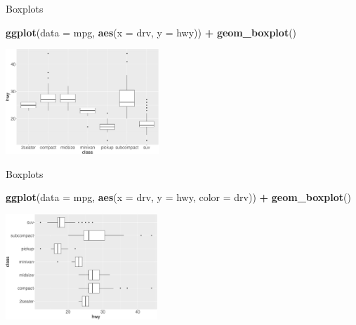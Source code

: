 \documentclass[ignorenonframetext,]{beamer}
\newenvironment{Shaded}{\begin{snugshade}}{\end{snugshade}}
\newcommand{\DataTypeTok}[1]{\textcolor[rgb]{0.13,0.29,0.53}{#1}}
\newcommand{\KeywordTok}[1]{\textcolor[rgb]{0.13,0.29,0.53}{\textbf{#1}}}
\newcommand{\NormalTok}[1]{#1}
\newcommand{\OperatorTok}[1]{\textcolor[rgb]{0.81,0.36,0.00}{\textbf{#1}}}
\newcommand{\StringTok}[1]{\textcolor[rgb]{0.31,0.60,0.02}{#1}}
\begin{document}
\begin{frame}[fragile]{Boxplots}
\protect\hypertarget{boxplots-1}{}

\begin{Shaded}
\begin{Highlighting}[]
\KeywordTok{ggplot}\NormalTok{(}\DataTypeTok{data =}\NormalTok{ mpg, }\KeywordTok{aes}\NormalTok{(}\DataTypeTok{x =}\NormalTok{ drv, }\DataTypeTok{y =}\NormalTok{ hwy)) }\OperatorTok{+}\StringTok{ }
\StringTok{  }\KeywordTok{geom_boxplot}\NormalTok{()}
\end{Highlighting}
\end{Shaded}

\begin{center}\includegraphics[height=150px]{data-visualization_files/figure-beamer/unnamed-chunk-140-1} \end{center}

\end{frame}

\begin{frame}[fragile]{Boxplots}
\protect\hypertarget{boxplots-2}{}

\begin{Shaded}
\begin{Highlighting}[]
\KeywordTok{ggplot}\NormalTok{(}\DataTypeTok{data =}\NormalTok{ mpg, }
       \KeywordTok{aes}\NormalTok{(}\DataTypeTok{x =}\NormalTok{ drv, }\DataTypeTok{y =}\NormalTok{ hwy, }\DataTypeTok{color =}\NormalTok{ drv)) }\OperatorTok{+}\StringTok{ }
\StringTok{  }\KeywordTok{geom_boxplot}\NormalTok{()}
\end{Highlighting}
\end{Shaded}

\begin{center}\includegraphics[height=150px]{data-visualization_files/figure-beamer/unnamed-chunk-141-1} \end{center}

\end{frame}
\end{document}
